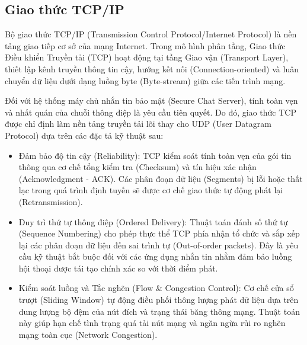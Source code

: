 \subsection{Giao thức TCP/IP}

Bộ giao thức TCP/IP (Transmission Control Protocol/Internet Protocol) là nền tảng giao tiếp cơ sở của mạng Internet. Trong mô hình phân tầng, Giao thức Điều khiển Truyền tải (TCP) hoạt động tại tầng Giao vận (Transport Layer), thiết lập kênh truyền thông tin cậy, hướng kết nối (Connection-oriented) và luân chuyển dữ liệu dưới dạng luồng byte (Byte-stream) giữa các tiến trình mạng.

Đối với hệ thống máy chủ nhắn tin bảo mật (Secure Chat Server), tính toàn vẹn và nhất quán của chuỗi thông điệp là yêu cầu tiên quyết. Do đó, giao thức TCP được chỉ định làm nền tảng truyền tải lõi thay cho UDP (User Datagram Protocol) dựa trên các đặc tả kỹ thuật sau:
\begin{itemize}[label={-}]
    \item Đảm bảo độ tin cậy (Reliability): TCP kiểm soát tính toàn vẹn của gói tin thông qua cơ chế tổng kiểm tra (Checksum) và tín hiệu xác nhận (Acknowledgment - ACK). Các phân đoạn dữ liệu (Segments) bị lỗi hoặc thất lạc trong quá trình định tuyến sẽ được cơ chế giao thức tự động phát lại (Retransmission).
    \item Duy trì thứ tự thông điệp (Ordered Delivery): Thuật toán đánh số thứ tự (Sequence Numbering) cho phép thực thể TCP phía nhận tổ chức và sắp xếp lại các phân đoạn dữ liệu đến sai trình tự (Out-of-order packets). Đây là yêu cầu kỹ thuật bắt buộc đối với các ứng dụng nhắn tin nhằm đảm bảo luồng hội thoại được tái tạo chính xác so với thời điểm phát.
    \item Kiểm soát luồng và Tắc nghẽn (Flow \& Congestion Control): Cơ chế cửa sổ trượt (Sliding Window) tự động điều phối thông lượng phát dữ liệu dựa trên dung lượng bộ đệm của nút đích và trạng thái băng thông mạng. Thuật toán này giúp hạn chế tình trạng quá tải nút mạng và ngăn ngừa rủi ro nghẽn mạng toàn cục (Network Congestion).
\end{itemize}

